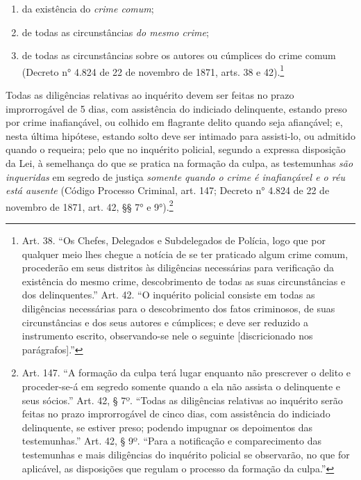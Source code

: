 \begin{enumerate}[label=\arabic*º]
\item da existência do \emph{crime comum};

\item de todas as circunstâncias \emph{do mesmo crime};

\item de todas as circunstâncias sobre os autores ou cúmplices do crime
comum (Decreto n° 4.824 de 22 de novembro de 1871, arts. 38 e
42).\footnote{Art. 38. ``Os Chefes, Delegados e Subdelegados de
  Polícia, logo que por qualquer meio lhes chegue a notícia de se ter
  praticado algum crime comum, procederão em seus distritos às
  diligências necessárias para verificação da existência do mesmo crime,
  descobrimento de todas as suas circunstâncias e dos delinquentes.''
  Art. 42. ``O inquérito policial consiste em todas as diligências
  necessárias para o descobrimento dos fatos criminosos, de suas
  circunstâncias e dos seus autores e cúmplices; e deve ser reduzido a
  instrumento escrito, observando-se nele o seguinte {[}discricionado
  nos parágrafos{]}.''}
\end{enumerate}

Todas as diligências relativas ao inquérito devem ser feitas no prazo
improrrogável de 5 dias, com assistência do indiciado delinquente,
estando preso por crime inafiançável, ou colhido em flagrante delito
quando seja afiançável; e, nesta última hipótese, estando solto deve ser
intimado para assisti-lo, ou admitido quando o requeira; pelo que no
inquérito policial, segundo a expressa disposição da Lei, à semelhança
do que se pratica na formação da culpa, as testemunhas \emph{são
inqueridas} em segredo de justiça \emph{somente quando o crime é
inafiançável e o réu está ausente} (Código Processo
Criminal, art. 147; Decreto n° 4.824 de 22 de novembro de
1871, art. 42, §§ 7° e 9°).\footnote{Art. 147. ``A formação da culpa
  terá lugar enquanto não prescrever o delito e proceder-se-á em segredo
  somente quando a ela não assista o delinquente e seus sócios.''
  Art. 42, § 7º. ``Todas as diligências relativas ao inquérito serão
  feitas no prazo improrrogável de cinco dias, com assistência do
  indiciado delinquente, se estiver preso; podendo impugnar os
  depoimentos das testemunhas.''
  Art. 42, § 9º. ``Para a notificação e comparecimento das testemunhas e
  mais diligências do inquérito policial se observarão, no que for
  aplicável, as disposições que regulam o processo da formação da
  culpa.''}

